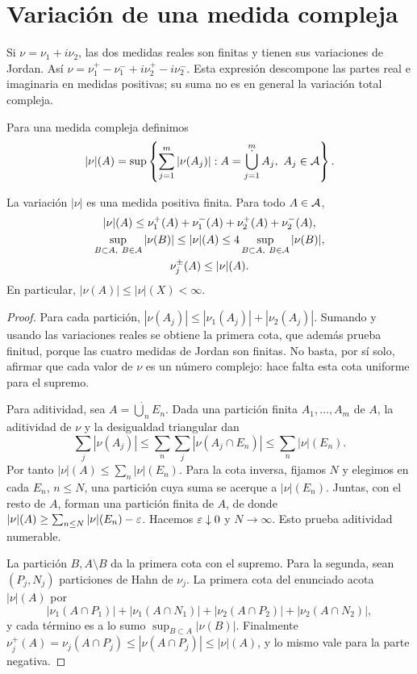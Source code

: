 \section{Variación de una medida compleja}\label{lectura:v2-26}
Si $\nu=\nu_1+i\nu_2$, las dos medidas reales son finitas y tienen sus variaciones de Jordan. Así
$\nu=\nu_1^+-\nu_1^-+i\nu_2^+-i\nu_2^-$. Esta expresión descompone las partes real e imaginaria en medidas positivas; su suma no es en general la variación total compleja.
\begin{definicion}
Para una medida compleja definimos
\[
 |\nu|(A)=\sup\left\{\sum_{j=1}^m|\nu(A_j)|:A=\mathop{\dot\bigcup}_{j=1}^mA_j,\ A_j\in\Acal\right\}.
\]
\end{definicion}
\begin{teorema}\label{v2:variacion-compleja}
La variación $|\nu|$ es una medida positiva finita. Para todo $A\in\mathcal A$,
\begin{gather*}
 |\nu|(A)\le\nu_1^+(A)+\nu_1^-(A)+\nu_2^+(A)+\nu_2^-(A),\\
 \sup_{B\subset A,\ B\in\mathcal A}|\nu(B)|\le|\nu|(A)
 \le4\sup_{B\subset A,\ B\in\mathcal A}|\nu(B)|,\\
  \nu_j^\pm(A)\le|\nu|(A).
\end{gather*}
En particular, $|\nu(A)|\le|\nu|(X)<\infty$.
\end{teorema}
\begin{proof}
Para cada partición, $|\nu(A_j)|\le|\nu_1(A_j)|+|\nu_2(A_j)|$. Sumando y usando las variaciones reales se obtiene la primera cota, que además prueba finitud, porque las cuatro medidas de Jordan son finitas. No basta, por sí solo, afirmar que cada valor de $\nu$ es un número complejo: hace falta esta cota uniforme para el supremo.

Para aditividad, sea $A=\dot\bigcup_n E_n$. Dada una partición finita $A_1,\ldots,A_m$ de $A$, la aditividad de $\nu$ y la desigualdad triangular dan
\[
 \sum_j|\nu(A_j)|\le\sum_n\sum_j|\nu(A_j\cap E_n)|\le\sum_n|\nu|(E_n).
\]
Por tanto $|\nu|(A)\le\sum_n|\nu|(E_n)$. Para la cota inversa, fijamos $N$ y elegimos en cada $E_n$, $n\le N$, una partición cuya suma se acerque a $|\nu|(E_n)$. Juntas, con el resto de $A$, forman una partición finita de $A$, de donde $|\nu|(A)\ge\sum_{n\le N}|\nu|(E_n)-\varepsilon$. Hacemos $\varepsilon\downarrow0$ y $N\to\infty$. Esto prueba aditividad numerable.

La partición $B,A\setminus B$ da la primera cota con el supremo. Para la segunda, sean $(P_j,N_j)$ particiones de Hahn de $\nu_j$. La primera cota del enunciado acota $|\nu|(A)$ por
\[
 |\nu_1(A\cap P_1)|+|\nu_1(A\cap N_1)|+
 |\nu_2(A\cap P_2)|+|\nu_2(A\cap N_2)|,
\]
y cada término es a lo sumo $\sup_{B\subset A}|\nu(B)|$. Finalmente $\nu_j^+(A)=\nu_j(A\cap P_j)\le|\nu(A\cap P_j)|\le|\nu|(A)$, y lo mismo vale para la parte negativa.
\end{proof}
